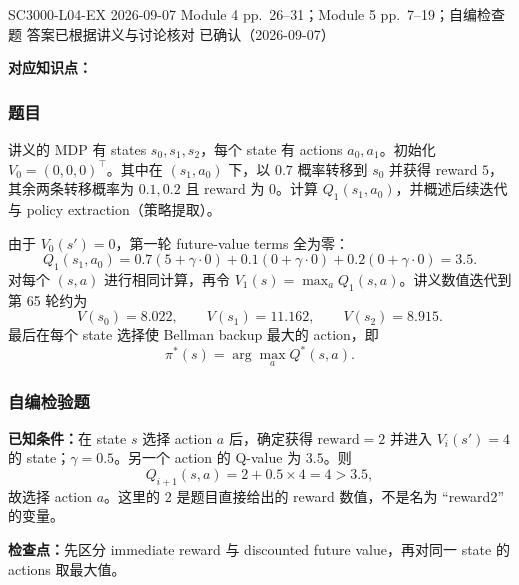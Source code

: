 
\clearpage
{}

\examplemeta
  {SC3000-L04-EX}
  {2026-09-07}
  {Module 4 pp.~26--31；Module 5 pp.~7--19；自编检查题}
  {答案已根据讲义与讨论核对}
  {已确认（2026-09-07）}


\textbf{对应知识点：}

\subsubsection*{题目}

讲义的 MDP 有 states $s_0,s_1,s_2$，每个 state 有 actions $a_0,a_1$。初始化 $V_0=(0,0,0)^\top$。其中在 $(s_1,a_0)$ 下，以 $0.7$ 概率转移到 $s_0$ 并获得 reward $5$，其余两条转移概率为 $0.1,0.2$ 且 reward 为 $0$。计算 $Q_1(s_1,a_0)$，并概述后续迭代与 policy extraction（策略提取）。

\begin{checkedsolution}
由于 $V_0(s')=0$，第一轮 future-value terms 全为零：
\[
  Q_1(s_1,a_0)
  =0.7(5+\gamma\cdot0)+0.1(0+\gamma\cdot0)
   +0.2(0+\gamma\cdot0)
  =\boxed{3.5}.
\]
对每个 $(s,a)$ 进行相同计算，再令 $V_1(s)=\max_a Q_1(s,a)$。讲义数值迭代到第 65 轮约为
\[
  V(s_0)=8.022,
  \qquad V(s_1)=11.162,
  \qquad V(s_2)=8.915.
\]
最后在每个 state 选择使 Bellman backup 最大的 action，即
\[
  \pi^*(s)=\arg\max_a Q^*(s,a).
\]
\end{checkedsolution}

\subsubsection*{自编检验题}

\textbf{已知条件：}在 state $s$ 选择 action $a$ 后，确定获得 $\boxed{\text{reward}=2}$ 并进入 $V_i(s')=4$ 的 state；$\gamma=0.5$。另一个 action 的 Q-value 为 $3.5$。则
\[
  Q_{i+1}(s,a)=2+0.5\times4=\boxed{4}>3.5,
\]
故选择 action $a$。这里的 $2$ 是题目直接给出的 reward 数值，不是名为 ``reward2'' 的变量。

\textbf{检查点：}先区分 immediate reward 与 discounted future value，再对同一 state 的 actions 取最大值。

\clearpage
{}


